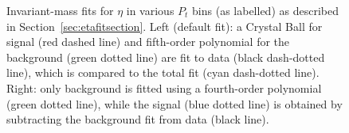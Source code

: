 \begin{figure}[H]
\ContinuedFloat*
 \centering
\label{fig:etaptfit}
\caption[Invariant-mass fits for $\eta$ in various \(P_{t}\) bins]{Invariant-mass fits for $\eta$ in various \(P_{t}\) bins (as labelled) as described in Section~\ref{sec:etafitsection}. Left (default fit):  a Crystal Ball for signal (red dashed line) and fifth-order polynomial for the background (green dotted line) are fit to data (black dash-dotted line), which is compared to the total fit  (cyan dash-dotted line). Right: only background is fitted using a fourth-order polynomial (green dotted line), while the signal (blue dotted line) is obtained by subtracting the background fit from data (black line).}
\end{figure}
